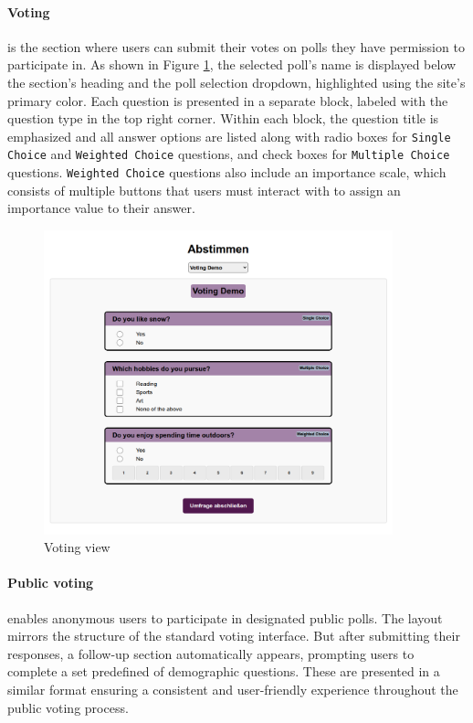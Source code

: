 \documentclass[a4paper,12pt]{report}
\begin{document}
\paragraph{Voting} is the section where users can submit their votes on polls they have permission to participate in. As shown in Figure \ref{fig:voting_view}, the selected poll's name is displayed below the section's heading and the poll selection dropdown, highlighted using the site's primary color. Each question is presented in a separate block, labeled with the question type in the top right corner. Within each block, the question title is emphasized and all answer options are listed along with radio boxes for \texttt{Single Choice} and \texttt{Weighted Choice} questions, and check boxes for \texttt{Multiple Choice} questions. \texttt{Weighted Choice} questions also include an importance scale, which consists of multiple buttons that users must interact with to assign an importance value to their answer.
\begin{figure}[H]
	\centering
	\includegraphics[width=0.9\textwidth]{pics/voting_view.png}
	\caption{Voting view}
	\label{fig:voting_view}
\end{figure}
\paragraph{Public voting} enables anonymous users to participate in designated public polls. The layout mirrors the structure of the standard voting interface. But after submitting their responses, a follow-up section automatically appears, prompting users to complete a set predefined of demographic questions. These are presented in a similar format ensuring a consistent and user-friendly experience throughout the public voting process.\\\\
\end{document}
